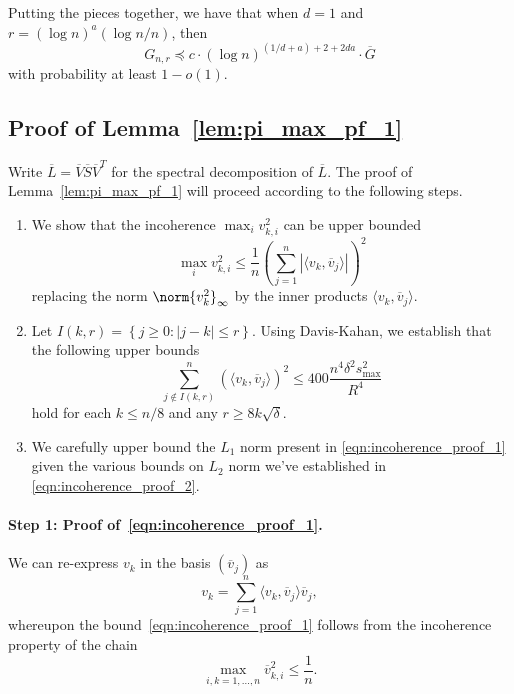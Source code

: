 \documentclass{article}
\newcommand{\abs}[1]{\left \lvert #1 \right \rvert}
\newcommand{\set}[1]{\left\{#1\right\}}
\newcommand{\1}{\mathbf{1}}
\newcommand{\dotp}[2]{\langle #1, #2 \rangle}
\theoremstyle{alden}
\theoremstyle{aldenthm}
\theoremstyle{definition}
\theoremstyle{remark}
\begin{document}
Putting the pieces together, we have that when $d = 1$ and $r = (\log n)^a (\log n/n)$, then
\begin{equation*}
G_{n,r} \preceq c \cdot (\log n)^{(1/d + a) + 2 + 2da}\cdot \overline{G}
\end{equation*}
with probability at least $1 - o(1)$.

\subsection{Proof of Lemma~\ref{lem:pi_max_pf_1}}

Write $\overline{L} = \overline{V}\overline{S} \overline{V}^T$ for the spectral decomposition of $\overline{L}$. The proof of Lemma~\ref{lem:pi_max_pf_1} will proceed according to the following steps.
\begin{enumerate}
	\item We show that the incoherence $\max_{i} v_{k,i}^2$ can be upper bounded
	\begin{equation}
	\label{eqn:incoherence_proof_1}
	\max_{i} v_{k,i}^2 \leq \frac{1}{n} \left(\sum_{j = 1}^{n} \abs{\dotp{v_k}{\overline{v}_j}}\right)^2
	\end{equation}
	replacing the norm $\norm{v_k^2}_{\infty}$ by the inner products $\dotp{v_k}{\overline{v}_j}$.
	\item Let $I(k,r) = \set{j \geq 0: \abs{j - k} \leq r}$. Using Davis-Kahan, we establish that the following upper bounds
	\begin{equation}
	\label{eqn:incoherence_proof_2}
	\sum_{j \not\in I(k,r)}^{n} (\dotp{v_k}{\overline{v}_j})^2 \leq 400 \frac{n^4 \delta^2 s_{\max}^2}{R^4}
	\end{equation}
	hold for each $k \leq n/8$ and any $r \geq 8k\sqrt{\delta}$. 
	\item We carefully upper bound the $L_1$ norm present in \eqref{eqn:incoherence_proof_1} given the various bounds on $L_2$ norm we've established in \eqref{eqn:incoherence_proof_2}.
\end{enumerate}

\paragraph{Step 1: Proof of~\eqref{eqn:incoherence_proof_1}.}

We can re-express $v_k$ in the basis $(\overline{v}_j)$ as
\begin{equation*}
v_k = \sum_{j = 1}^{n} \dotp{v_k}{\overline{v}_j} \overline{v}_j,
\end{equation*}
whereupon the bound~\eqref{eqn:incoherence_proof_1} follows from the incoherence property of the chain
\begin{equation*}
\max_{i,k = 1,\ldots,n} \overline{v}_{k,i}^2 \leq \frac{1}{n}.
\end{equation*}
\end{document}
